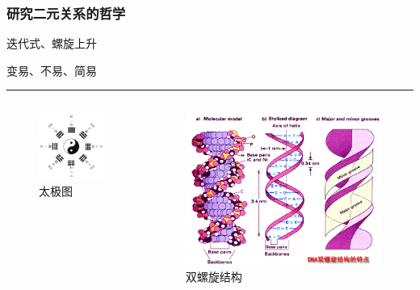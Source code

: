\begin{frame}
  \frametitle{研究二元关系的哲学}
  \begin{description}[辩证发展观]
    \item [辩证发展观] 迭代式、螺旋上升
    \item [易之三义] 变易、不易、简易
  \end{description}
  \hrule
  \begin{columns}[b]
    \begin{figure}
      \centering\includegraphics[scale=.35]{images/taiji.jpg}
      \caption{太极图}
      \label{taiji}
    \end{figure}
    \begin{figure}
      \centering\includegraphics[scale=.25]{images/dna.jpg}
      \caption{双螺旋结构}
      \label{dna}
    \end{figure}
  \end{columns}
\end{frame}

